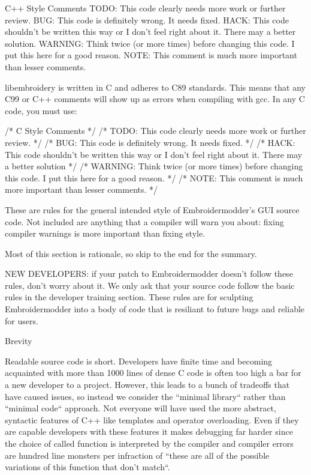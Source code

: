 \documentclass[a4paper]{report}
\begin{document}
    C++ Style Comments
    TODO: This code clearly needs more work or further review.
    BUG: This code is definitely wrong. It needs fixed.
    HACK: This code shouldn't be written this way or I don't feel right about it. There may a better solution.
    WARNING: Think twice (or more times) before changing this code. I put this here for a good reason.
    NOTE: This comment is much more important than lesser comments.

libembroidery is written in C and adheres to C89 standards. This means
that any C99 or C++ comments will show up as errors when compiling with
gcc. In any C code, you must use:

    /* C Style Comments */
    /* TODO: This code clearly needs more work or further review. */
    /* BUG: This code is definitely wrong. It needs fixed. */
    /* HACK: This code shouldn't be written this way or I don't feel right about it. There may a better solution */
    /* WARNING: Think twice (or more times) before changing this code. I put this here for a good reason. */
    /* NOTE: This comment is much more important than lesser comments. */

These are rules for the general intended style of Embroidermodder's GUI source
code. Not included are anything that a compiler will warn you about: fixing
compiler warnings is more important than fixing style.

Most of this section is rationale, so skip to the end for the summary.

NEW DEVELOPERS: if your patch to Embroidermodder doesn't follow these rules,
don't worry about it. We only ask that your source code follow the basic rules
in the developer training section. These rules are for sculpting Embroidermodder
into a body of code that is resiliant to future bugs and reliable for users.

Brevity
~~~~~~~

Readable source code is short. Developers have finite time and becoming
acquainted with more than 1000 lines of dense C code is often too high a bar
for a new developer to a project. However, this leads to a bunch of tradeoffs
that have caused issues, so instead we consider the ``minimal library``
rather than ``minimal code`` approach. Not everyone will have used the more
abstract, syntactic features of C++ like templates and operator overloading.
Even if they are capable developers with these features it makes debugging far
harder since the choice of called function is interpreted by the compiler and compiler
errors are hundred line monsters per infraction of ``these are all of the possible
variations of this function that don't match``.
\end{document}
